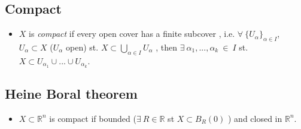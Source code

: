 \documentclass[11pt]{article}
\numberwithin{equation}{section}
\begin{document}
\subsection{Compact}
\begin{itemize}
    \item $X$ is \emph{compact} if every open cover has a finite subcover , i.e. $\forall~\{U_{\alpha}\}_{\alpha \in I}$, $U_{\alpha} \subset X $ ($U_{\alpha}$ open) st.  $ X \subset \bigcup_{\alpha \in I} U_{\alpha} $ , then $\exists~\alpha_1,...,\alpha_k~\in~I$ st. $X \subset U_{\alpha_1}\cup ...\cup U_{\alpha_k}$.   
\end{itemize}

\subsection{Heine Boral theorem}
\begin{itemize}
    \item $X \subset \mathbb{R}^n$ is compact if bounded ($\exists~R \in \mathbb{R}$ st $X \subset B_{R}(0)$ ) and closed in $\mathbb{R}^n$. 
\end{itemize}
\end{document}
